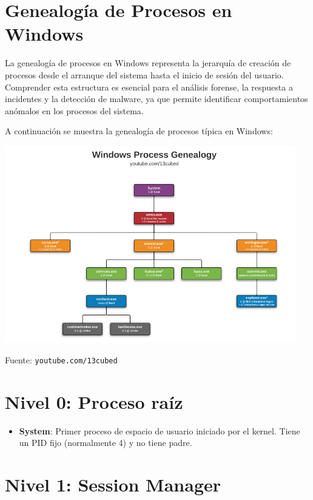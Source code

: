\section{Genealogía de Procesos en Windows}

La genealogía de procesos en Windows representa la jerarquía de creación de
procesos desde el arranque del sistema hasta el inicio de sesión del usuario.
Comprender esta estructura es esencial para el análisis forense, la respuesta a
incidentes y la detección de malware, ya que permite identificar comportamientos
anómalos en los procesos del sistema.

\vspace{1em}
\noindent A continuación se muestra la genealogía de procesos típica en
Windows:

\begin{center}
    \includegraphics[width=0.95\textwidth]{figures/fig-annex-win-process-genealogy.png}
\end{center}

\noindent Fuente: \texttt{youtube.com/13cubed}

\section*{Nivel 0: Proceso raíz}

\begin{itemize}
    \item \textbf{System}: Primer proceso de espacio de usuario iniciado por el
    kernel. Tiene un PID fijo (normalmente 4) y no tiene padre.
\end{itemize}

\section*{Nivel 1: Session Manager}

